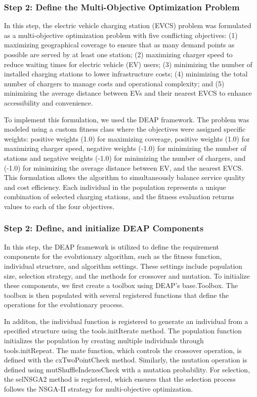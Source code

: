 \subsubsection*{Step 2: Define the Multi-Objective Optimization Problem} 
In this step, the electric vehicle charging station (EVCS) problem was formulated as a multi-objective optimization problem with five conflicting objectives: (1) maximizing geographical coverage to ensure that as many demand points as possible are served by at least one station; (2) maximizing charger speed to reduce waiting times for electric vehicle (EV) users; (3) minimizing the number of installed charging stations to lower infrastructure costs; (4) minimizing the total number of chargers to manage costs and operational complexity; and (5) minimizing the average distance between EVs and their nearest EVCS to enhance accessibility and convenience.


To implement this formulation, we used the DEAP framework\cite{Evolutionary algorithms made easy}. The problem was modeled using a custom fitness class where the objectives were assigned specific weights: positive weights (1.0) for maximizing coverage, positive weights (1.0) for maximizing charger speed, negative weights (-1.0) for minimizing the number of stations and negative weights (-1.0) for minimizing the number of chargers, and (-1.0) for minimizing the average distance between EV, and the nearest EVCS. This formulation allows the algorithm to simultaneously balance service quality and cost efficiency. Each individual in the population represents a unique combination of selected charging stations, and the fitness evaluation returns values to each of the four objectives. 


\subsubsection*{Step 2: Define, and initialize DEAP Components}

In this step, the DEAP framework is utilized to define the requirement components for the evolutionary algorithm, such as the fitness function, individual structure, and algorithm settings. These settings include population size, selection strategy, and the methods for crossover and mutation. To initialize these components, we first create a toolbox using DEAP's base.Toolbox. The toolbox is then populated with several registered functions that define the operations for the evolutionary process.

In additon, the individual function is registered to generate an individual from a specified structure using the tools.initIterate method. The population function initializes the population by creating multiple individuals through tools.initRepeat. The mate function, which controls the crossover operation, is defined with the cxTwoPointCheck method. Similarly, the mutation operation is defined using mutShuffleIndexesCheck with a mutation probability. For selection, the selNSGA2 method is registered, which ensures that the selection process follows the NSGA-II strategy for multi-objective optimization. 


